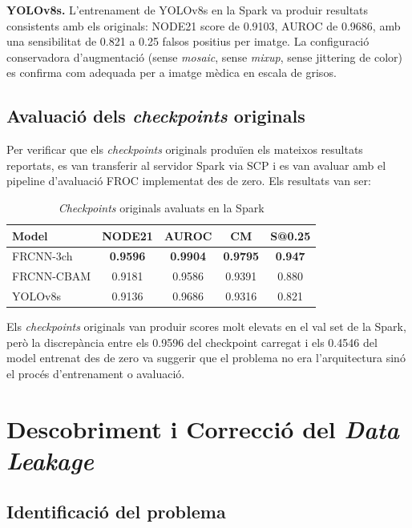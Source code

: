 \documentclass[conference]{IEEEtran}
\begin{document}
\textbf{YOLOv8s.} L'entrenament de YOLOv8s en la Spark va produir resultats consistents amb els originals: NODE21 score de 0.9103, AUROC de 0.9686, amb una sensibilitat de 0.821 a 0.25 falsos positius per imatge. La configuració conservadora d'augmentació (sense \textit{mosaic}, sense \textit{mixup}, sense jittering de color) es confirma com adequada per a imatge mèdica en escala de grisos.

\subsection{Avaluació dels \textit{checkpoints} originals}

Per verificar que els \textit{checkpoints} originals produïen els mateixos resultats reportats, es van transferir al servidor Spark via SCP i es van avaluar amb el pipeline d'avaluació FROC implementat des de zero. Els resultats van ser:

\begin{table}[t]
\centering
\caption{\textit{Checkpoints} originals avaluats en la Spark}
\label{tab:originals}
\small
\setlength{\tabcolsep}{4pt}
\begin{tabular}{lcccc}
\toprule
Model & NODE21 & AUROC & CM & S@0.25 \\
\midrule
FRCNN-3ch & \textbf{0.9596} & \textbf{0.9904} & \textbf{0.9795} & \textbf{0.947} \\
FRCNN-CBAM & 0.9181 & 0.9586 & 0.9391 & 0.880 \\
YOLOv8s & 0.9136 & 0.9686 & 0.9316 & 0.821 \\
\bottomrule
\end{tabular}
\end{table}

Els \textit{checkpoints} originals van produir scores molt elevats en el val set de la Spark, però la discrepància entre els 0.9596 del checkpoint carregat i els 0.4546 del model entrenat des de zero va suggerir que el problema no era l'arquitectura sinó el procés d'entrenament o avaluació.

\section{Descobriment i Correcció del \textit{Data Leakage}}

\subsection{Identificació del problema}
\end{document}
